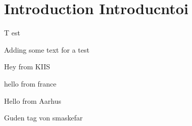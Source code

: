 

\section{Introduction Introducntoi}

\lettrine{T}{ }est
\lipsum


Adding some text for a test

Hey from KIIS

hello from france

Hello from Aarhus

Guden tag von smaskefar